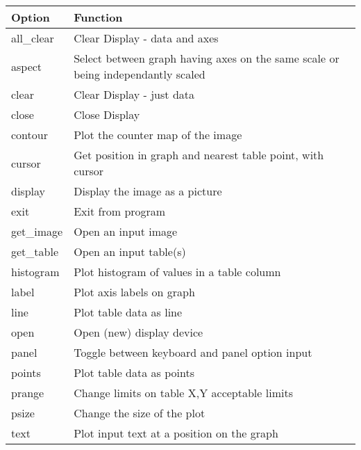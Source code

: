 \begin{small}
{{\vspace*{2mm}\begin{tabular}{|l|p{4.5in}|}\hline
   Option    & Function \\ \hline
   all\_clear &  Clear Display - data and axes \\
   aspect    &  Select between graph having axes on the same scale or
                 being independantly scaled \\
   clear     &  Clear Display - just data \\
   close     &  Close Display \\
   contour   &  Plot the counter map of the image \\
   cursor    &  Get position in graph and nearest table point, with cursor \\
   display   &  Display the image as a picture \\
   exit      &  Exit from program \\
   get\_image &  Open an input image \\
   get\_table &  Open an input table(s) \\
   histogram &  Plot histogram of values in a table column \\
   label     &  Plot axis labels on graph \\
   line      &  Plot table data as line \\
   open      &  Open (new) display device \\
   panel     &  Toggle between keyboard and panel option input \\
   points    &  Plot table data as points \\
   prange    &  Change limits on table X,Y acceptable limits \\
   psize     &  Change the size of the plot \\
   text      &  Plot input text at a position on the graph \\ 
\hline
\end{tabular}\vspace*{2mm}
 
}}
\end{small}
